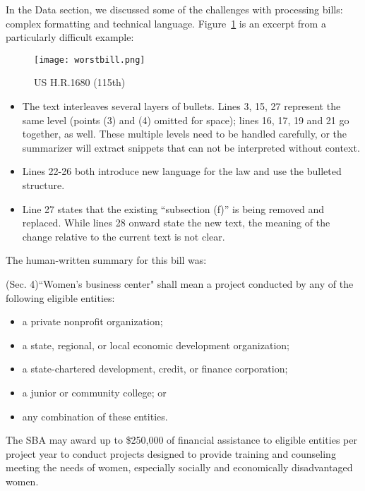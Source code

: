 \documentclass[11pt,a4paper]{article}
\begin{document}
In the Data section, we discussed some of the challenges with processing bills: complex formatting and technical language. Figure~\ref{fig:worstbill} is an excerpt from a particularly difficult example:  

\begin{figure}[!h]
   \texttt{[image: worstbill.png]}
    \caption{US H.R.1680 (115th)}
    \label{fig:worstbill}
    \vspace{-1.2mm}
\end{figure}

\begin{itemize}
    \item The text interleaves several layers of bullets. Lines 3, 15, 27 represent the same level (points (3) and (4) omitted for space); lines 16, 17, 19 and 21 go together, as well. These multiple levels need to be handled carefully, or the summarizer will extract snippets that can not be interpreted without context.
    \item Lines 22-26 both introduce new language for the law and use the bulleted structure.
    \item Line 27 states that the existing ``subsection (f)'' is being removed and replaced. While lines 28 onward state the new text, the meaning of the change relative to the current text is not clear.
\end{itemize}

The human-written summary for this bill was:\\

\begin{it}
(Sec. 4)``Women's business center" shall mean a project conducted by any of the following eligible entities:
\begin{itemize}
    \item a private nonprofit organization;
    \item a state, regional, or local economic development organization;
    \item a state-chartered development, credit, or finance corporation;
    \item a junior or community college; or
    \item any combination of these entities.
\end{itemize}
The SBA may award up to \$250,000 of financial assistance to eligible entities per project year to conduct projects designed to provide training and counseling meeting the needs of women, especially socially and economically disadvantaged women.
\end{it}\\
\end{document}
